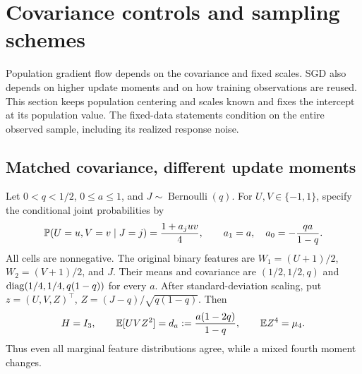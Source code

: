 \section{Covariance controls and sampling schemes}
\label{sec:sampling}

Population gradient flow depends on the covariance and fixed scales. SGD also
depends on higher update moments and on how training observations are reused.
This section keeps population centering and scales known and fixes the intercept
at its population value. The fixed-data statements condition on the entire
observed sample, including its realized response noise.

\subsection{Matched covariance, different update moments}

Let $0 < q < 1/2$, $0 \le a \le 1$, and $J \sim \operatorname{Bernoulli}(q)$.
For $U,V \in \{-1,1\}$, specify the conditional joint probabilities by
\[
 \mathbb{P}(U = u,V = v \mid J = j) = \frac{1 + a_j uv}{4},\qquad a_1
                               = a,\quad a_0
                               = -\frac{qa}{1 - q}.
\]
All cells are nonnegative. The original binary features are $W_1 = (U + 1)/2$,
$W_2 = (V + 1)/2$, and $J$. Their means and covariance are $(1/2,1/2,q)$ and
$\operatorname{diag}(1/4,1/4,q(1 - q))$ for every $a$. After standard-deviation scaling, put
$z = (U,V,Z)^\top$, $Z = (J - q)/\sqrt{q(1 - q)}$. Then
\[
 H = I_3,\qquad \mathbb{E}[UVZ^2]
   = d_a
   := \frac{a(1 - 2q)}{1 - q},\qquad \mathbb{E} Z^4
   = \mu_4.
\]
Thus even all marginal feature distributions agree, while a mixed fourth moment
changes.


